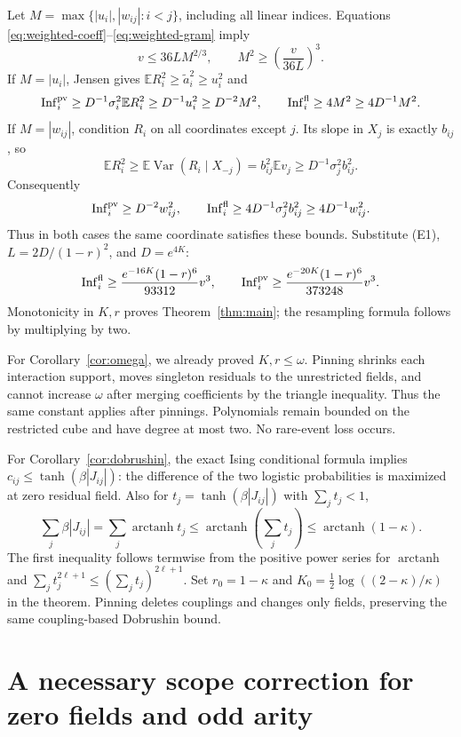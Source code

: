 \documentclass[11pt]{article}
\newcommand{\E}{\mathbb E}
\newcommand{\Var}{\operatorname{Var}}
\newcommand{\Inf}{\operatorname{Inf}}
\begin{document}
Let $M=\max\{|u_i|,|w_{ij}|:i<j\}$, including all linear indices.
Equations \eqref{eq:weighted-coeff}--\eqref{eq:weighted-gram} imply
\[
 v\le36LM^{2/3},\qquad M^2\ge\left(\frac{v}{36L}\right)^3.
 \tag{E1}
\]
If $M=|u_i|$, Jensen gives
$\E R_i^2\ge\widetilde a_i^2\ge u_i^2$ and
\[
 \Inf_i^{\rm pv}\ge D^{-1}\sigma_i^2\E R_i^2
       \ge D^{-1}u_i^2\ge D^{-2}M^2,
 \qquad \Inf_i^{\rm fl}\ge4M^2\ge4D^{-1}M^2.
\]
If $M=|w_{ij}|$, condition $R_i$ on all coordinates except $j$.
Its slope in $X_j$ is exactly $b_{ij}$, so
\[
 \E R_i^2\ge\E\Var(R_i\mid X_{-j})
       =b_{ij}^2\E v_j\ge D^{-1}\sigma_j^2b_{ij}^2.
\]
Consequently
\[
 \Inf_i^{\rm pv}\ge D^{-2}w_{ij}^2,
 \qquad
 \Inf_i^{\rm fl}\ge4D^{-1}\sigma_j^2b_{ij}^2
                    \ge4D^{-1}w_{ij}^2.
\]
Thus in both cases the same coordinate satisfies these bounds.
Substitute (E1), $L=2D/(1-r)^2$, and $D=e^{4K}$:
\[
 \Inf_i^{\rm fl}\ge\frac{e^{-16K}(1-r)^6}{93312}v^3,
 \qquad
 \Inf_i^{\rm pv}\ge\frac{e^{-20K}(1-r)^6}{373248}v^3.
\]
Monotonicity in $K,r$ proves Theorem~\ref{thm:main}; the resampling
formula follows by multiplying by two.

For Corollary~\ref{cor:omega}, we already proved $K,r\le\omega$.
Pinning shrinks each interaction support, moves singleton residuals
to the unrestricted fields, and cannot increase $\omega$ after
merging coefficients by the triangle inequality. Thus the same
constant applies after pinnings. Polynomials remain bounded on the
restricted cube and have degree at most two. No rare-event loss occurs.

For Corollary~\ref{cor:dobrushin}, the exact Ising conditional formula
implies $c_{ij}\le\tanh(\beta|J_{ij}|)$: the difference of the
two logistic probabilities is maximized at zero residual field.
Also for $t_j=\tanh(\beta|J_{ij}|)$ with $\sum_jt_j<1$,
\[
 \sum_j\beta|J_{ij}|=\sum_j\operatorname{arctanh}t_j
       \le\operatorname{arctanh}(\sum_jt_j)
       \le\operatorname{arctanh}(1-\kappa).
\]
The first inequality follows termwise from the positive power series
for $\operatorname{arctanh}$ and
$\sum_jt_j^{2\ell+1}\le(\sum_jt_j)^{2\ell+1}$.
Set $r_0=1-\kappa$ and
$K_0=\frac12\log((2-\kappa)/\kappa)$ in the theorem.
Pinning deletes couplings and changes only fields, preserving the
same coupling-based Dobrushin bound.

\section{A necessary scope correction for zero fields and odd arity}
\end{document}
